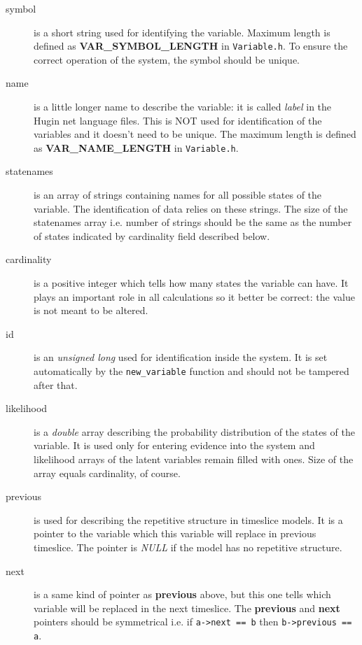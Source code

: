 \documentclass[12pt,a4paper]{report}
\begin{document}
\begin{description}
\item[symbol] is a short string used for identifying the variable. Maximum
length is defined as \textbf{VAR\_SYMBOL\_LENGTH} in
\verb+Variable.h+. To ensure the correct operation of the system, the 
symbol should be unique.
\item[name] is a little longer name to describe the variable: it is
called {\it label} in the Hugin net language files. This is NOT used for 
identification of the variables and it doesn't need to be unique. 
The maximum length is defined as \textbf{VAR\_NAME\_LENGTH} in 
\verb+Variable.h+.
\item[statenames] is an array of strings containing names for all
possible states of the variable. The identification of data relies on
these strings. The size of the statenames array i.e. number of
strings should be the same as the number of states indicated by
cardinality field described below.
\item[cardinality] is a positive integer which tells how many states
the variable can have. It plays an important role in all calculations
so it better be correct: the value is not meant to be altered.
\item[id] is an {\it unsigned long} used for identification inside the
system. It is set automatically by the \verb+new_variable+ function
and should not be tampered after that.
\item[likelihood] is a {\it double} array describing the probability
distribution of the states of the variable. It is used only for
entering evidence into the system and likelihood arrays of the latent
variables remain filled with ones. Size of the array equals
cardinality, of course.
\item[previous] is used for describing the repetitive structure in
timeslice models. It is a pointer to the variable which this variable
will replace in previous timeslice. The pointer is {\it NULL} if the
model has no repetitive structure.
\item[next] is a same kind of pointer as \textbf{previous} above, but
this one tells which variable will be replaced in the next timeslice.
The \textbf{previous} and \textbf{next} pointers should be symmetrical
i.e. if \verb+a->next == b+ then \verb+b->previous == a+.
\end{description}
\end{document}
